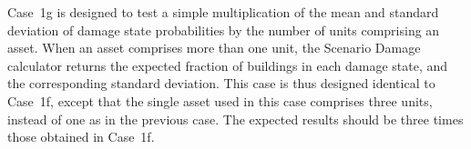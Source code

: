 Case~1g is designed to test a simple multiplication of the mean and standard deviation of damage state probabilities by the number of units comprising an asset. When an asset comprises more than one unit, the Scenario Damage calculator returns the expected fraction of buildings in each damage state, and the corresponding standard deviation. This case is thus designed identical to Case~1f, except that the single asset used in this case comprises three units, instead of one as in the previous case. The expected results should be three times those obtained in Case~1f.